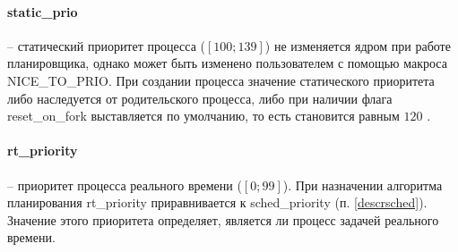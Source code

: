 \paragraph*{static\_prio} -- статический приоритет процесса ($[100; 139]$) не изменяется ядром при работе планировщика, однако может быть изменено пользователем с помощью макроса NICE\_TO\_PRIO. При создании процесса значение статического приоритета либо наследуется от родительского процесса, либо при наличии флага reset\_on\_fork выставляется по умолчанию, то есть становится равным $120$ \cite{bib:5}. 







\paragraph*{rt\_priority} -- приоритет процесса реального времени ($[0; 99]$). При назначении алгоритма планирования rt\_priority приравнивается к sched\_priority (п. \ref{descrsched}). Значение этого приоритета определяет, является ли процесс задачей реального времени. 

